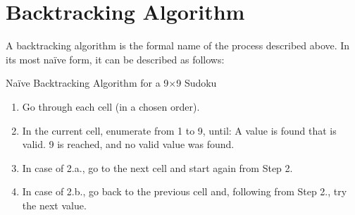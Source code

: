 \documentclass[12pt]{report} %
\begin{document}
\section{Backtracking Algorithm}

A backtracking algorithm is the formal name of the process described above\cite{cornell_sudoku}.
In its most naïve form, it can be described as follows:


\begin{definitionbox}{Naïve Backtracking Algorithm for a 9$\times$9 Sudoku}

  \begin{enumerate}
    \item Go through each cell (in a chosen order).
    \item In the current cell, enumerate from 1 to 9, until:
     A value is found that is valid.
     9 is reached, and no valid value was found.
    \item In case of 2.a., go to the next cell and start again from Step 2.
    \item In case of 2.b., go back to the previous cell and, following from Step 2., try the next value.
  \end{enumerate}

\end{definitionbox}
\end{document}
